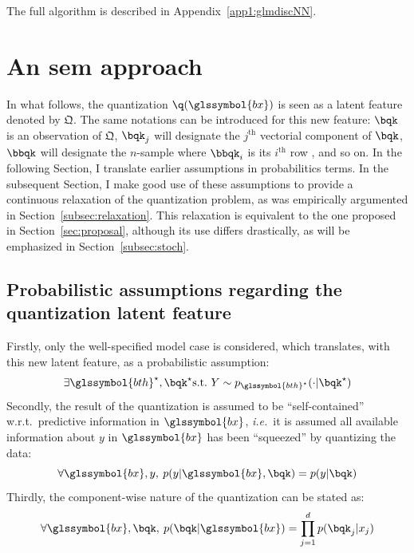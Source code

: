 The full algorithm is described in Appendix~\ref{app1:glmdiscNN}.


\section{An \gls{sem} approach} \label{sec:sem}
 
 
In what follows, the quantization $\q(\glssymbol{bx})$ is seen as a latent feature denoted by $\bm{\mathfrak{Q}}$. The same notations can be introduced for this new feature:  $\bqk$ is an observation of $\bm{\mathfrak{Q}}$, $\bqk_j$ will designate the $j^{\text{th}}$ vectorial component of $\bqk$, $\bbqk$ will designate the $n$-sample where $\bbqk_i$ is its $i^{\text{th}}$ row
, and so on. In the following Section, I translate earlier assumptions in probabilitics terms. In the subsequent Section, I make good use of these assumptions to provide a continuous relaxation of the quantization problem, as was empirically argumented in Section~\ref{subsec:relaxation}. This relaxation is equivalent to the one proposed in Section~\ref{sec:proposal}, although its use differs drastically, as will be emphasized in Section~\ref{subsec:stoch}.

\subsection{Probabilistic assumptions regarding the quantization latent feature}

Firstly, only the well-specified model case is considered, which translates, with this new latent feature, as a probabilistic assumption:
\begin{equation} \label{hyp:true}
\exists \glssymbol{bth}^\star, \bqk^\star \text{s.t.\ } Y \sim p_{\glssymbol{bth}^\star}(\cdot | \bqk^\star)
\end{equation}
Secondly, the result of the quantization is assumed to be ``self-contained'' w.r.t.\ predictive information in $\glssymbol{bx}$, \textit{i.e.}\ it is assumed all available information about $y$ in $\glssymbol{bx}$ has been ``squeezed'' by quantizing the data:
\begin{equation} \label{hyp:squeeze}
\forall \glssymbol{bx},y,\: p(y|\glssymbol{bx},\bqk) = p(y|\bqk)
\end{equation}
Thirdly, the component-wise nature of the quantization can be stated as:
\begin{equation} \label{hyp:component}
\forall \glssymbol{bx},\bqk,\: p(\bqk|\glssymbol{bx}) = \prod_{j=1}^d p(\bqk_j | x_j)
\end{equation}



